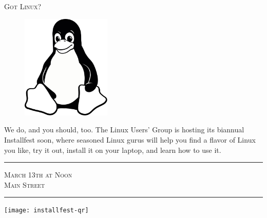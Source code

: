 \documentclass[12pt]{article}
\begin{document}
\pagestyle{empty}

\begin{center} \LARGE \scshape
    Got Linux?
\end{center}

\begin{figure}
    \vspace{-2em} %
    \begin{center}
        \includegraphics[width=0.38\textwidth]{tux-bw}
    \end{center}
    \vspace{-2em} %
\end{figure}

{%

    We do, and you should, too. The Linux Users' Group is hosting its biannual
    Installfest soon, where seasoned Linux gurus will help you find a flavor of
    Linux you like, try it out, install it on your laptop, and learn how to use
    it.

}

\vfill

\begin{minipage}[bt]{0.58\textwidth}
    \begin{center}
        \hrule{}
        \vspace{1em}
        {\large \scshape
            March 13th at Noon\\
            Main Street
        }
        \vspace{1em}
        \hrule{}
    \end{center}
\end{minipage}
\begin{minipage}[bt]{0.38\textwidth}
    \begin{center}
        \texttt{[image: installfest-qr]}
    \end{center}
\end{minipage}
\end{document}
